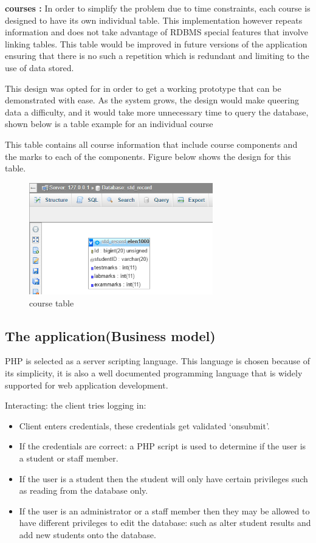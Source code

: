 \begin{itemize}
\textbf{courses : }
In order to simplify the problem due to time constraints, each course is designed to have its own individual table. This implementation however repeats information and does not take advantage of RDBMS special features that involve linking tables. This table would be improved in future versions of the application ensuring that there is no such a repetition which is redundant and limiting to the use of data stored.

This design was opted for in order to get a working prototype that can be demonstrated with ease. As the system grows, the design would make queering data a difficulty, and it would take more unnecessary time to query the database, shown below is a table example for an individual course

This table contains all course information that include course components and the marks to each of the components. Figure below shows the design for this table. 

\begin{center}
\begin{figure}[h]
\centering
\includegraphics[width=8cm]{marks}
\caption{course table}
\end{figure}
\end{center}
  
\end{itemize}

\subsection{The application(Business model)}
PHP is  selected as a server scripting language. This language is chosen because of its simplicity, it is also a well documented programming language that is widely supported for web application development.

Interacting: the client tries logging in:

\begin{itemize}
\item Client enters credentials, these credentials get validated ‘onsubmit’.


\item If the credentials are correct: a PHP script is used to determine if the user is a  student or staff member.
\item If the user is a student then the student will only have certain privileges such as reading from the database only.
\item If the user is an administrator or a staff member then they may be allowed to have different privileges to edit the database: such as alter student results and add new students onto the database.
\end{itemize}

  


